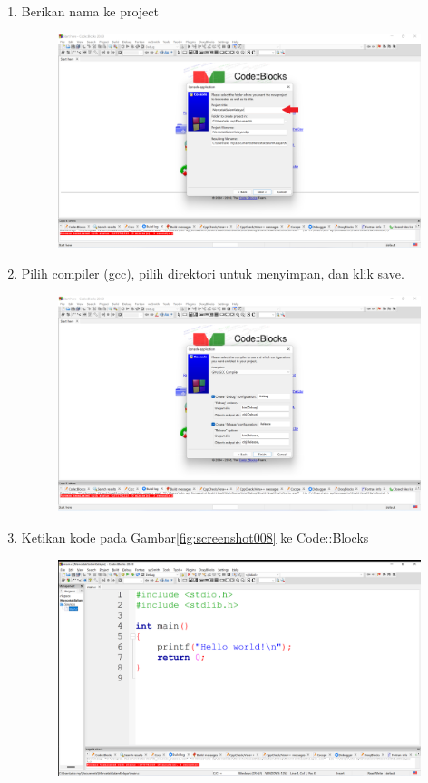 \begin{enumerate}
\begin{figure}[H]
		      \caption{}
		      \label{fig:screenshot005}
	      \end{figure}
	\item Berikan nama ke project
	      \begin{figure}[H]
		      \centering
		      \includegraphics[width=0.7\linewidth]{P1/img/screenshot006.png}
		      \caption{}
		      \label{fig:screenshot006}
	      \end{figure}
	\item  Pilih compiler (gcc), pilih direktori untuk menyimpan, dan klik save.
	      \begin{figure}[H]
		      \centering
		      \includegraphics[width=0.7\linewidth]{P1/img/screenshot007.png}
		      \caption{}
		      \label{fig:screenshot007}
	      \end{figure}
	\item Ketikan kode pada Gambar\ref{fig:screenshot008} ke Code::Blocks
	      \begin{figure}[H]
		      \centering
		      \includegraphics[width=0.7\linewidth]{P1/img/screenshot008.png}

\end{figure}
\end{enumerate}
